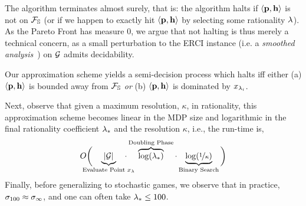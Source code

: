 The algorithm terminates almost surely, that is: 
the algorithm halts if $\langle \mathbf{p}, \mathbf{h} \rangle$ is
not on $\mathcal{F}_{\mathbb{S}}$ (or if we happen to exactly hit $\langle \mathbf{p}, \mathbf{h}\rangle$ by selecting some rationality $\lambda$).
As the Pareto Front has
measure 0, we argue that not halting is thus merely a technical concern, as a
small perturbation to the ERCI instance (i.e. a \emph{smoothed
analysis}~\cite{SmoothedAnalysis}) on $\mathcal{G}$ admits decidability. 
\begin{mdframed}
  Our approximation scheme yields a semi-decision process which halts
  iff either (a) $\langle \mathbf{p}, \mathbf{h} \rangle$ is
  bounded away from $\mathcal{F}_{\mathbb{S}}$ \emph{or} (b)
  $\langle \mathbf{p}, \mathbf{h} \rangle$ is dominated by
  $x_{\lambda_i}$.
\end{mdframed}
Next, observe that given a maximum resolution, $\kappa$, in
rationality, this approximation scheme becomes linear in the MDP size
and logarithmic in the final rationality coefficient $\lambda_*$ and the
resolution $\kappa$, i.e., the run-time is,
\begin{equation}
  O\bigg(\hspace{-1.4em}\underbrace{|\sg|}_{\text{Evaluate Point $x_\rat$}}\hspace{-1.4em}\cdot\overbrace{\log(\rat_*)}^{\text{Doubling Phase}}\cdot\underbrace{\log(\nicefrac{1}{\kappa})}_{\text{Binary Search}}\bigg)
\end{equation}
Finally, before generalizing to stochastic games, we observe that in
practice, $\sigma_{100} \approx \sigma_\infty$, and one can often take
$\lambda_* \leq 100$.

